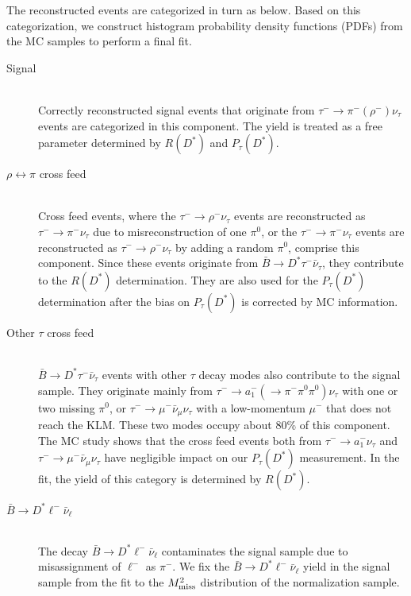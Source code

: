 \documentclass[aps,prd,twocolumn,superscriptaddress,showpacs,preprintnumbers,amsmath,amssymb]{revtex4-1}
\begin{document}
The reconstructed events are categorized in turn as below. Based on this categorization, we construct histogram probability density functions (PDFs) from the MC samples to perform a final fit.
\begin{description}
\item[Signal]\mbox{}\\
  Correctly reconstructed signal events that originate from $\tau^- \rightarrow \pi^- (\rho^-) \nu_\tau$ events are categorized in this component. The yield is treated as a free parameter determined by $R(D^*)$ and $P_{\tau}(D^*)$.
\item[\textbf{\boldmath$\rho \leftrightarrow \pi$} cross feed]\mbox{}\\
  Cross feed events, where the $\tau^- \rightarrow \rho^- \nu_\tau$ events are reconstructed as $\tau^- \rightarrow \pi^- \nu_\tau$ due to misreconstruction of one $\pi^0$, or the $\tau^- \rightarrow \pi^- \nu_\tau$ events are reconstructed as $\tau^- \rightarrow \rho^- \nu_\tau$ by adding a random $\pi^0$, comprise this component. Since these events originate from ${\bar B} \rightarrow D^* \tau^- \bar{\nu}_\tau$, they contribute to the $R(D^*)$ determination. They are also used for the $P_\tau(D^*)$ determination after the bias on $P_\tau(D^*)$ is corrected by MC information.
\item[Other \textbf{\boldmath$\tau$} cross feed]\mbox{}\\
  $\bar{B} \rightarrow D^* \tau^- \bar{\nu}_\tau$ events with other $\tau$ decay modes also contribute to the signal sample. They originate mainly from $\tau^- \rightarrow a_1^- (\rightarrow \pi^- \pi^0 \pi^0) \nu_\tau$ with one or two missing $\pi^0$, or $\tau^- \rightarrow \mu^- \bar{\nu}_\mu \nu_\tau$ with a low-momentum $\mu^-$ that does not reach the KLM. These two modes occupy about 80\% of this component. The MC study shows that the cross feed events both from $\tau^- \rightarrow a_1^- \nu_\tau$ and $\tau^- \rightarrow \mu^- \bar{\nu}_\mu \nu_\tau$ have negligible impact on our $P_\tau(D^*)$ measurement. In the fit, the yield of this category is determined by $R(D^*)$.
\item[\textbf{\boldmath$\bar{B} \rightarrow D^* \ell^- \bar{\nu}_\ell$}]\mbox{}\\
  The decay $\bar{B} \rightarrow D^* \ell^- \bar{\nu}_\ell$ contaminates the signal sample due to misassignment of $\ell^-$ as $\pi^-$. We fix the $\bar{B} \rightarrow D^* \ell^- \bar{\nu}_\ell$ yield in the signal sample from the fit to the $M_{\rm miss}^2$ distribution of the normalization sample.

\end{description}
\end{document}
